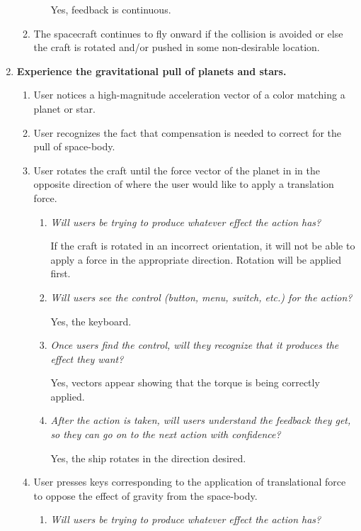 \begin{enumerate}
\begin{enumerate}
\begin{enumerate}
    Yes, feedback is continuous.
  \end{enumerate}

  \item The spacecraft continues to fly onward if the collision is avoided or else the craft is rotated and/or pushed in some non-desirable location.

\end{enumerate}

\item\textbf{Experience the gravitational pull of planets and stars.}
\begin{enumerate}

  \item User notices a high-magnitude acceleration vector of a color matching a planet or star.

  \item User recognizes the fact that compensation is needed to correct for the pull of space-body.

  \item User rotates the craft until the force vector of the planet in in the opposite direction of where the user would like to apply a translation force.
  \begin{enumerate}
    \item \emph{Will users be trying to produce whatever effect the action has?}
		
    If the craft is rotated in an incorrect orientation, it will not be able to apply a force in the appropriate direction.  Rotation will be applied first.
    \item \emph{Will users see the control (button, menu, switch, etc.) for the action?}

    Yes, the keyboard.
    \item \emph{Once users find the control, will they recognize that it produces the effect they want?}

    Yes, vectors appear showing that the torque is being correctly applied.
    \item \emph{After the action is taken, will users understand the feedback they get, so they can go on to the next action with confidence?}

    Yes, the ship rotates in the direction desired.
  \end{enumerate}

  \item User presses keys corresponding to the application of translational force to oppose the effect of gravity from the space-body.
  \begin{enumerate}
    \item \emph{Will users be trying to produce whatever effect the action has?}
		

\end{enumerate}
\end{enumerate}
\end{enumerate}
